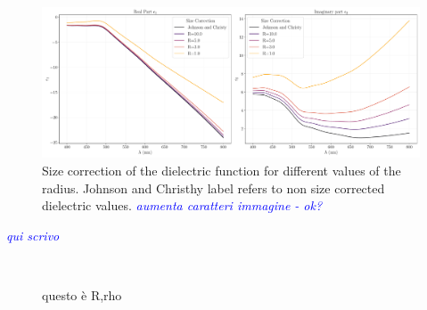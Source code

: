 \documentclass[twocolumn]{article}
\newcommand{\gio}[1]{\textcolor{blue}{\textit{#1}}}
\begin{document}
\begin{figure}[H]
    \begin{minipage}[l]{1.0\columnwidth}
    \centering
    \includegraphics[width=\textwidth]{image/data/size_correction.pdf}
    \caption{Size correction of the dielectric function for different values of the radius. Johnson and Christhy label refers to non size corrected dielectric values. \gio{aumenta caratteri immagine - ok?}}
    \label{fig:size_correction}
    \end{minipage}
\end{figure}

\begin{multicols}{2}
\gio{qui scrivo}

\end{multicols}

\begin{figure}[H]
\centering
{} 
 \\
\caption{questo è R,rho}
\label{fig:r_rho}
\end{figure}
\end{document}
